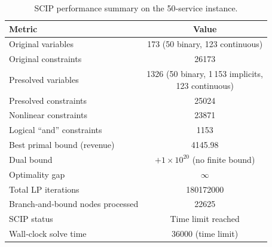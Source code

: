 \documentclass[Afour,sagev,times]{sagej}
\begin{document}
\begin{table}[htbp]
\centering
\scriptsize
\caption{SCIP performance summary on the 50‐service instance.}
\begin{tabular}{|p{}|c|}
\hline
\textbf{Metric}                              & \textbf{Value}                                         \\ \hline
Original variables                           & 173 (50 binary, 123 continuous)                               \\ 
Original constraints                         & 26173                                                       \\ \hline
Presolved variables                          & \makecell{1326 (50 binary, 1\,153 implicits,\\123 continuous)} \\ 
Presolved constraints                        & 25024                                                        \\ 
\quad Nonlinear constraints                   & 23871                                                        \\ 
\quad Logical “and” constraints               & 1153                                                         \\ \hline
Best primal bound (revenue)                  & 4145.98                                                      \\ 
Dual bound                                    & \(+1\times10^{20}\) (no finite bound)                          \\ 
Optimality gap                               & \(\infty\)                                                     \\ \hline
Total LP iterations                          & 180172000                                                       \\ 
Branch‐and‐bound nodes processed              & 22625                                                         \\ 
SCIP status                                  & Time limit reached                                              \\ 
Wall‐clock solve time                        & 36000 (time limit)                                          \\ \hline
\end{tabular}
\label{tab:scip_50_summary}
\end{table}
\end{document}
